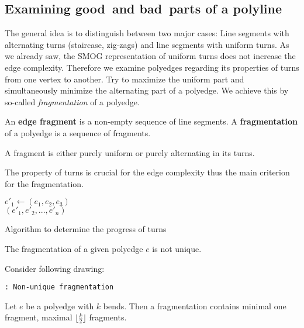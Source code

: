 \subsection{Examining \grqq good\grqq~and \grqq bad\grqq~parts of a polyline}
The general idea is to distinguish between two major cases: Line segments with alternating turns (staircase, zig-zags) and line segments with uniform turns. As we already saw, the SMOG representation of uniform turns does not increase the edge complexity. Therefore we examine polyedges regarding its properties of turns from one vertex to another. Try to maximize the uniform part and simultaneously minimize the alternating part of a polyedge. We achieve this by so-called \textit{fragmentation} of a polyedge.
\begin{definition}
An \textbf{edge fragment} is a non-empty sequence of line segments. A \textbf{fragmentation} of a polyedge is a sequence of fragments.
\end{definition}
\begin{lemma}
	A fragment is either purely uniform or purely alternating in its turns.
\end{lemma}
The property of turns is crucial for the edge complexity thus the main criterion for the fragmentation.\\
\begin{algorithm}[H]
$e'_1 \gets (e_1,e_2,e_3)$\\
\Return $(e'_1,e'_2,...,e'_n)$
	\caption{Algorithm to determine the progress of turns}
\end{algorithm}
\begin{lemma}The fragmentation of a given polyedge $e$ is not unique.
\end{lemma}
\begin{sketch}
	Consider following drawing:
	\begin{center}\texttt{\TODO: Non-unique fragmentation}
	\end{center}
\end{sketch}
\begin{lemma}
	Let $e$ be a polyedge with $k$ bends. Then a fragmentation contains minimal one fragment, maximal $\lfloor\frac{k}{2}\rfloor$ fragments.
\end{lemma}
